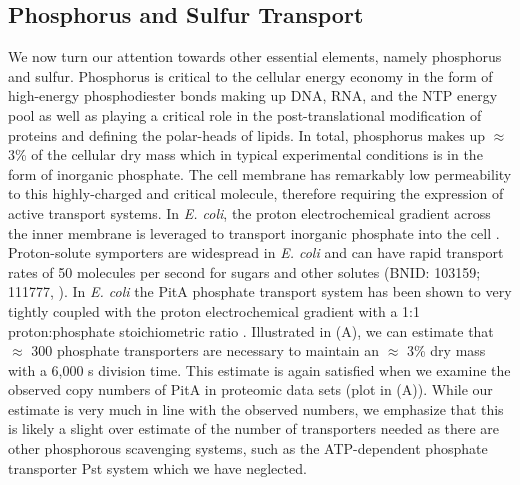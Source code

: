 \subsection{Phosphorus and Sulfur Transport}
We now turn our attention towards other essential elements, namely phosphorus and
sulfur. Phosphorus is critical to the cellular energy economy in the form of
high-energy phosphodiester bonds making up DNA, RNA, and the NTP energy pool as
well as playing a critical role in the post-translational modification of
proteins and defining the polar-heads of lipids. In total, phosphorus
makes up $\approx$3\% of the cellular dry mass which in typical experimental conditions is in the form of inorganic phosphate. The cell membrane
has remarkably low permeability to this highly-charged and critical molecule,
therefore requiring the expression of active transport systems. In \textit{E. coli}, the proton
electrochemical gradient across the inner membrane is leveraged to transport
inorganic phosphate into the cell \citep{rosenberg1977}.
Proton-solute symporters are widespread in \textit{E. coli} \citep{ramos1977,
booth1979} and can have rapid transport rates of 50 molecules per second for
sugars and other solutes (BNID: 103159; 111777, \cite{milo2010}). In \textit{E.
coli} the PitA phosphate transport system has been shown to very tightly coupled
with the proton electrochemical gradient with a 1:1 proton:phosphate
stoichiometric ratio \citep{harris2001, feist2007}. Illustrated in
(A), we can estimate that $\approx$ 300
phosphate transporters are necessary to maintain an $\approx$ 3\% dry mass with
a 6,000 s division time. This estimate is again satisfied when we examine the
observed copy numbers of PitA in proteomic data sets (plot in
(A)). While our estimate is very much in line with the
observed numbers, we emphasize that this is likely a slight over estimate of the
number of transporters needed as there are other phosphorous scavenging systems,
such as the ATP-dependent phosphate transporter Pst system which we have neglected.

